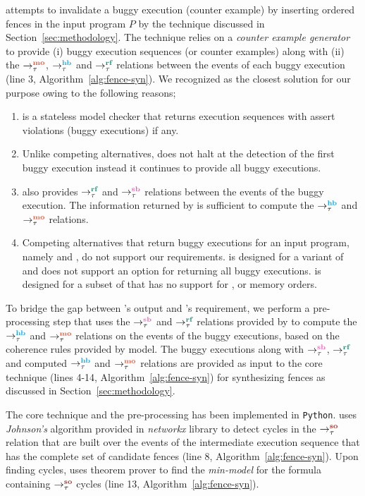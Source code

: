 \ourtechnique attempts to invalidate a buggy execution (\aka counter
example) by inserting \sc ordered fences in the input program $P$
by the technique discussed in Section~\ref{sec:methodology}.
%
The technique relies on a {\em counter example generator} to provide
(i) buggy execution sequences (or counter examples) along with (ii)
the $\setMO$, $\setHB$ and $\setRF$ relations between the events of 
each buggy execution (line 3, Algorithm~\ref{alg:fence-syn}).
%
We recognized \cds \cite{cds} as the closest solution for our purpose
owing to the following reasons;

\begin{enumerate}
	\item \cds is a stateless model checker that returns execution sequences 
		with assert violations (\aka buggy executions) if any.
	
	\item Unlike competing alternatives, \cds does not halt at the detection 
		of the first buggy execution instead it continues to provide all buggy 
		executions.
	
	\item \cds also provides $\setRF$ and $\setSB$ relations between the events 
		of the buggy execution. The information returned by \cds is sufficient
		to compute the $\setHB$ and $\setMO$ relations.
	
	\item Competing alternatives that return buggy executions for an input
		program, namely \genmc \cite{genmc-PLDI19} and \tracer \cite{tracer2018}, 
		do not support our requirements.
		\genmc is designed for a variant of \cc \cite{LahavVafeiadis-PLDI17} and
		does not support an option for returning all buggy executions. \tracer is
		designed for a subset of \cc that has no support for \sc, \na or \rel 
		memory orders.
\end{enumerate}

To bridge the gap between \cds's output and \ourtechnique's requirement,
we perform a pre-processing step that uses the $\setSB$ and $\setRF$ relations 
provided by \cds to compute the $\setHB$ and $\setMO$ relations on the events
of the buggy executions, based on the coherence rules provided by \cc model.
%
The buggy executions along with $\setSB$, $\setRF$ and computed $\setHB$ 
and $\setMO$ relations are provided as input to the core technique 
(lines 4-14, Algorithm~\ref{alg:fence-syn}) for synthesizing fences as
discussed in Section~\ref{sec:methodology}.

The core technique and the pre-processing has been implemented in 
{\tt Python}.
\ourtechnique uses {\em Johnson's} algorithm provided in {\em networkx}
library to detect cycles in the $\setSO$ relation that are built over the \sc
events of the intermediate execution sequence that has the complete set 
of candidate fences (line 8, Algorithm~\ref{alg:fence-syn}).
%
Upon finding cycles, \ourtechnique uses \z theorem prover to find the 
{\em min-model} for the formula containing $\setSO$ cycles (line 13, 
Algorithm~\ref{alg:fence-syn}).


